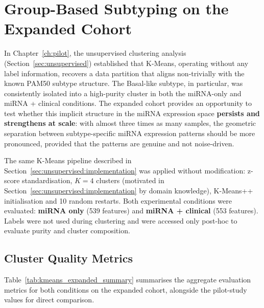 \FloatBarrier
\section{Group-Based Subtyping on the Expanded Cohort}
\label{sec:expanded_unsupervised}

In Chapter~\ref{ch:pilot}, the unsupervised clustering analysis
(Section~\ref{sec:unsupervised}) established that K-Means, operating without any
label information, recovers a data partition that aligns non-trivially with the known
PAM50 subtype structure. The Basal-like subtype, in particular, was consistently
isolated into a high-purity cluster in both the miRNA-only and miRNA + clinical
conditions. The expanded cohort provides an opportunity to test whether this implicit
structure in the miRNA expression space \textbf{persists and strengthens at scale}:
with almost three times as many samples, the geometric separation between
subtype-specific miRNA expression patterns should be more pronounced, provided that
the patterns are genuine and not noise-driven.

The same K-Means pipeline described in Section~\ref{sec:unsupervised:implementation}
was applied without modification: z-score standardisation, $K = 4$
clusters (motivated in Section~\ref{sec:unsupervised:implementation} by domain
knowledge), K-Means++ initialisation and 10 random restarts. Both experimental conditions were
evaluated: \textbf{miRNA only} (539 features) and \textbf{miRNA + clinical}
(553 features). Labels were not used during clustering and were accessed only
post-hoc to evaluate purity and cluster composition.

\subsection{Cluster Quality Metrics}
\label{sec:expanded_kmeans_metrics}

Table~\ref{tab:kmeans_expanded_summary} summarises the aggregate evaluation metrics
for both conditions on the expanded cohort, alongside the pilot-study values for
direct comparison.

